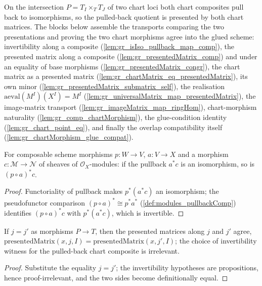 On the intersection \(P = T_I \times_T T_J\) of two chart loci both chart composites pull
back to isomorphisms, so the pulled-back quotient is presented by both chart matrices. The
blocks below assemble the transports comparing the two presentations and proving the two
chart morphisms agree into the glued scheme: invertibility along a composite
(\cref{lem:gr_isIso_pullback_map_comp}), the presented matrix along a composite
(\cref{lem:gr_presentedMatrix_comp}) and under an equality of base morphisms
(\cref{lem:gr_presentedMatrix_congr}), the chart matrix as a presented matrix
(\cref{lem:gr_chartMatrix_eq_presentedMatrix}), its own minor
(\cref{lem:gr_presentedMatrix_submatrix_self}), the realisation
\(\mathrm{aeval}(M^I)(X^I) = M^I\) (\cref{lem:gr_universalMatrix_map_presentedMatrix}), the
image-matrix transport (\cref{lem:gr_imageMatrix_map_ringHom}), chart-morphism naturality
(\cref{lem:gr_comp_chartMorphism}), the glue-condition identity
(\cref{lem:gr_chart_point_eq}), and finally the overlap compatibility itself
(\cref{lem:gr_chartMorphism_glue_compat}).

\begin{lemma}
  \label{lem:gr_isIso_pullback_map_comp}
  For composable scheme morphisms \(p : W \to V\), \(a : V \to X\) and a morphism
  \(c : \mathcal{M} \to \mathcal{N}\) of sheaves of \(\mathcal{O}_X\)-modules: if the
  pullback \(a^{*}c\) is an isomorphism, so is \((p \circ a)^{*}c\).
\end{lemma}
\begin{proof}
  Functoriality of pullback makes \(p^{*}(a^{*}c)\) an isomorphism; the pseudofunctor
  comparison \((p \circ a)^{*} \cong p^{*}a^{*}\) (\cref{def:modules_pullbackComp})
  identifies \((p \circ a)^{*}c\) with \(p^{*}(a^{*}c)\), which is invertible.
\end{proof}

\begin{lemma}
  \label{lem:gr_presentedMatrix_congr}
  If \(j = j'\) as morphisms \(P \to T\), then the presented matrices along \(j\) and \(j'\)
  agree, \(\mathrm{presentedMatrix}(x, j, I) = \mathrm{presentedMatrix}(x, j', I)\); the
  choice of invertibility witness for the pulled-back chart composite is irrelevant.
\end{lemma}
\begin{proof}
  Substitute the equality \(j = j'\); the invertibility hypotheses are propositions, hence
  proof-irrelevant, and the two sides become definitionally equal.
\end{proof}

